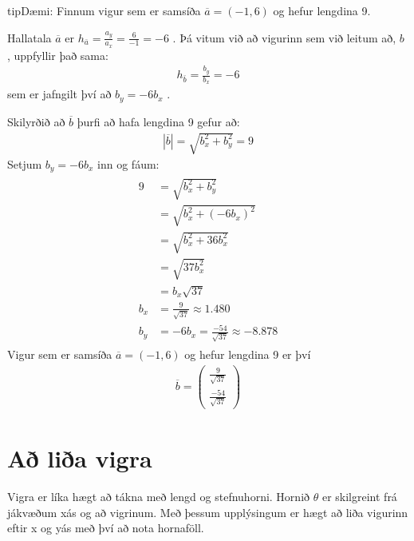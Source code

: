 \documentclass[a4paper,10pt,icelandic]{sphinxmanual}
\begin{document}
\begin{sphinxadmonition}{tip}{Dæmi:}
Finnum vigur sem er samsíða \(\overline{a}=(-1,6)\) og hefur lengdina 9.

Hallatala \(\overline{a}\) er \(h_{\bar{a}}=\frac{a_y}{a_x}=\frac{6}{-1}=-6\) .
Þá vitum við að vigurinn sem við leitum að, \(b\) , uppfyllir það sama:
\begin{equation*}
\begin{split}h_{\bar{b}}=\frac{b_y}{b_x}=-6\end{split}
\end{equation*}
sem er jafngilt því að \(b_y=-6b_x\) .

Skilyrðið að \(\overline{b}\) þurfi að hafa lengdina 9 gefur að:
\begin{equation*}
\begin{split}|\overline{b}| = \sqrt{b_x^2+b_y^2} =9\end{split}
\end{equation*}
Setjum \(b_y=-6b_x\) inn og fáum:
\begin{equation*}
\begin{split}\begin{aligned}
  9 &= \sqrt{b_x^2+b_y^2}\\
  &=\sqrt{b_x^2+(-6b_x)^2} \\
  &= \sqrt{b_x^2+36b_x^2} \\
  &=\sqrt{37b_x^2} \\
  &=b_x\sqrt{37} \\
  b_x&=\frac{9}{\sqrt{37}} \approx 1.480\\
  b_y&= -6b_x = \frac{-54}{\sqrt{37}} \approx -8.878
\end{aligned}\end{split}
\end{equation*}
Vigur sem er samsíða \(\overline{a}=(-1,6)\) og hefur lengdina 9 er því
\begin{equation*}
\begin{split}\overline{b}= \begin{pmatrix} \frac{9}{\sqrt{37}} \\  \frac{-54}{\sqrt{37}} \end{pmatrix}\end{split}
\end{equation*}\end{sphinxadmonition}


\section{Að liða vigra}
\label{\detokenize{Kafli08:a-lia-vigra}}
Vigra er líka hægt að tákna með lengd og stefnuhorni.
Hornið \(\theta\) er skilgreint frá jákvæðum x\sphinxhyphen{}ás og að vigrinum.
Með þessum upplýsingum er hægt að liða vigurinn eftir x\sphinxhyphen{} og y\sphinxhyphen{}ás með því að nota hornaföll.
\end{document}
